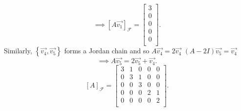 \documentclass{report}
\begin{document}
{ \[
    \implies \left[ A  \vec{ v_1} \right] _{ \mathcal{F}} = \begin{bmatrix}
    3\\
    0\\
    0\\
    0\\
    0\\
    \end{bmatrix}
 .\] 
 Similarly, $ \left\{ \vec{ v_4} ,\vec{ v_5}  \right\} $ forms a Jordan chain and so $ A \vec{ v_4} = 2 \vec{ v_4} $ $ \left( A -2I \right) \vec{ v_5} = \vec{ v_4} $ \\
 \[
    \implies A \vec{ v_5} = 2 \vec{ v_5} + \vec{ v_4}
 .\] 
  \[
    \left[ A  \right] _{ \mathcal{F}} = \begin{bmatrix}
    3 & 1 & 0 & 0 & 0\\
    0 & 3 & 1 & 0 & 0\\
    0 & 0 & 3 & 0 & 0\\
    0 & 0 & 0 & 2 & 1\\
    0 & 0 & 0 & 0 & 2\\
    \end{bmatrix}
  .\] 
  
}

       
\end{document}
